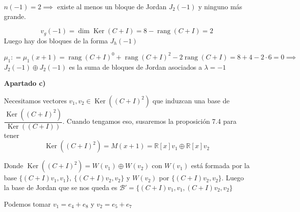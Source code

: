 \documentclass[openany]{book}
\begin{document}
\begin{exercise}
$ n(-1) = 2 \implies$ existe al menos un bloque de Jordan $ J_2(-1)$ y ninguno más grande.

$$ v_{g}(-1) = \operatorname{dim} \operatorname{Ker}(C+I) = 8 - \operatorname{rang}(C+I) = 2 $$
Luego hay dos bloques de la forma $ J_{h} (-1)$

$$ \mu_1 : = \mu_1(x+1) = \operatorname{rang}(C+I)^{0} + \operatorname{rang}(C+I)^2 -2 \operatorname{rang}(C+I) = 8+4-2\cdot 6=0 \implies  $$
$ J_2(-1)\oplus J_2(-1)$ es la suma de bloques de Jordan asociados a $ \lambda  = -1$

\begin{flushright}
    \textbf{Apartado c)}
\end{flushright}

Necesitamos vectores $ v_1,v_2\in \operatorname{Ker}((C+I)^2) $ que induzcan una base de $ \dfrac{\operatorname{Ker}((C+I)^2)}{\operatorname{Ker}((C+I))}$. Cuando tengamos eso, susaremos la proposición 7.4 para tener
$$ \operatorname{Ker}((C+I)^2) = M(x+1) = \mathbb{R}[x]v_1 \oplus \mathbb{R}[x]v_2 $$

Donde $ \operatorname{Ker}((C+I)^2) = W(v_1)\oplus W(v_2)$ con $ W(v_1)$ está formada por la base $ \{(C+I)v_1,v_1\},\ \{(C+I)v_2,v_2\}$ y $ W(v_2)$ por $ \{(C+I)v_2,v_2\}$. Luego la base de Jordan que se nos queda es $ \mathcal{B}' = \{(C+I)v_1,v_1,(C+I)v_2,v_2\}$

Podemos tomar $ v_1 = e_4+e_8$ y $ v_2 = e_5+e_7$

\end{exercise}
\end{document}

